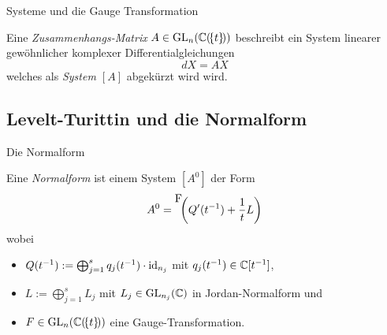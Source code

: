 \begin{frame}{Systeme und die Gauge Transformation}
  \begin{defn}
    Eine \emph{Zusammenhangs-Matrix} $A\in\operatorname{GL}_n(\mathbb{C}(\!\{t\}\!))$ beschreibt ein
    System linearer gewöhnlicher komplexer Differentialgleichungen
    \[
      dX=AX
    \]
    welches als \emph{System \boldmath$[A]$} abgekürzt wird wird.
  \end{defn}
\end{frame}

\subsection{Levelt-Turittin und die Normalform}
\begin{frame}{Die Normalform}
  \begin{defn}
    Eine \emph{Normalform} ist einem System $[A^0]$ der Form
    \[
      A^0= \raisebox{1em}{F} \!\!\left(Q'(t^{-1})+\frac{1}{t}L\right)
    \]
    wobei
    \begin{itemize}
    \item $Q(t^{-1}):=\bigoplus_{j=1}^sq_j(t^{-1})\cdot\operatorname{id}_{n_j}$ mit
      $q_j(t^{-1})\in\mathbb{C}[t^{-1}]$,
    \item $L:=\bigoplus_{j=1}^sL_j$ mit $L_j\in\operatorname{GL}_{n_j}(\mathbb{C})$ in
      Jordan-Normalform und
    \item $F\in\operatorname{GL}_n(\mathbb{C}(\!\{t\}\!))$ eine Gauge-Transformation.
    \end{itemize}
  \end{defn}
\end{frame}

